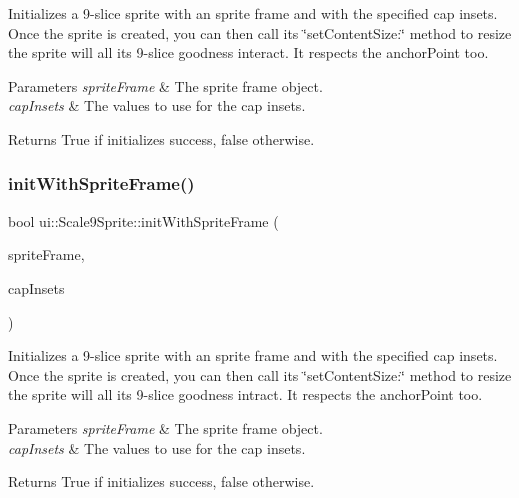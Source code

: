 Initializes a 9-\/slice sprite with an sprite frame and with the specified cap insets. Once the sprite is created, you can then call its \char`\"{}set\+Content\+Size\+:\char`\"{} method to resize the sprite will all it\textquotesingle{}s 9-\/slice goodness interact. It respects the anchor\+Point too.


\begin{DoxyParams}{Parameters}
{\em sprite\+Frame} & The sprite frame object. \\
\hline
{\em cap\+Insets} & The values to use for the cap insets. \\
\hline
\end{DoxyParams}
\begin{DoxyReturn}{Returns}
True if initializes success, false otherwise. 
\end{DoxyReturn}
\mbox{\label{classui_1_1Scale9Sprite_ade227fd72fa88fc071803260cac0d9b5}} 
\subsubsection{\texorpdfstring{init\+With\+Sprite\+Frame()}{initWithSpriteFrame()}\hspace{0.1cm}{\footnotesize\ttfamily [2/3]}}
{\footnotesize\ttfamily bool ui\+::\+Scale9\+Sprite\+::init\+With\+Sprite\+Frame (\begin{DoxyParamCaption}\item[{\hyperlink{classSpriteFrame}{Sprite\+Frame} $\ast$}]{sprite\+Frame,  }\item[{const \hyperlink{classRect}{Rect} \&}]{cap\+Insets }\end{DoxyParamCaption})\hspace{0.3cm}{\ttfamily [virtual]}}

Initializes a 9-\/slice sprite with an sprite frame and with the specified cap insets. Once the sprite is created, you can then call its \char`\"{}set\+Content\+Size\+:\char`\"{} method to resize the sprite will all it\textquotesingle{}s 9-\/slice goodness intract. It respects the anchor\+Point too.


\begin{DoxyParams}{Parameters}
{\em sprite\+Frame} & The sprite frame object. \\
\hline
{\em cap\+Insets} & The values to use for the cap insets. \\
\hline
\end{DoxyParams}
\begin{DoxyReturn}{Returns}
True if initializes success, false otherwise. 
\end{DoxyReturn}
\mbox{\label{classui_1_1Scale9Sprite_a77f0c229307f987be75ebad959cb2b18}} 

